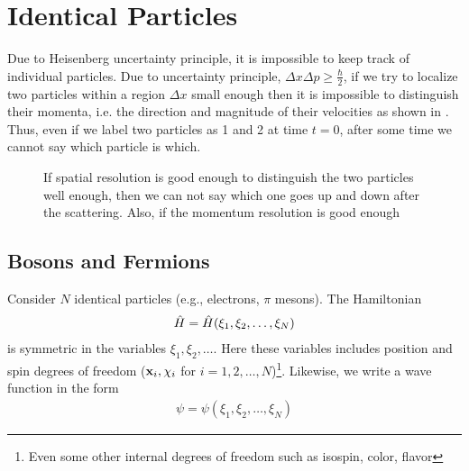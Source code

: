 \chapter{Identical Particles}

Due to Heisenberg uncertainty principle, it is impossible to keep track of individual particles. Due to uncertainty principle, $\Delta x \Delta p \geq \frac{\hbar}{2}$, if we try to localize two particles within a region $\Delta x$ small enough then it is impossible to distinguish their momenta, i.e. the direction and magnitude of their velocities as shown in . Thus, even if we label two particles as 1 and 2 at time $t=0$, after some time we cannot say which particle is which.
\begin{figure}[h!]
    \centering
\caption{If spatial resolution is good enough to distinguish the two particles well enough, then we can not say which one goes up and down after the scattering. Also, if the momentum resolution is good enough}
\end{figure}
\section{Bosons and Fermions}

Consider $N$ identical particles (e.g., electrons, $\pi$ mesons). The Hamiltonian 
\begin{align}
    \hat{H} = \hat{H}(\xi_1,\xi_2,\dots,\xi_N)
\end{align}
is symmetric in the variables $\xi_1,\xi_2,\dots$. Here these variables includes position and spin degrees of freedom ($\mathbf{x}_i,\chi_{i}$ for $i=1,2,\dots,N$)\footnote{Even some other internal degrees of freedom such as isospin, color, flavor}. Likewise, we write a wave function in the form 
\begin{align}
    \psi = \psi(\xi_1,\xi_2,\dots,\xi_N)
\end{align}

